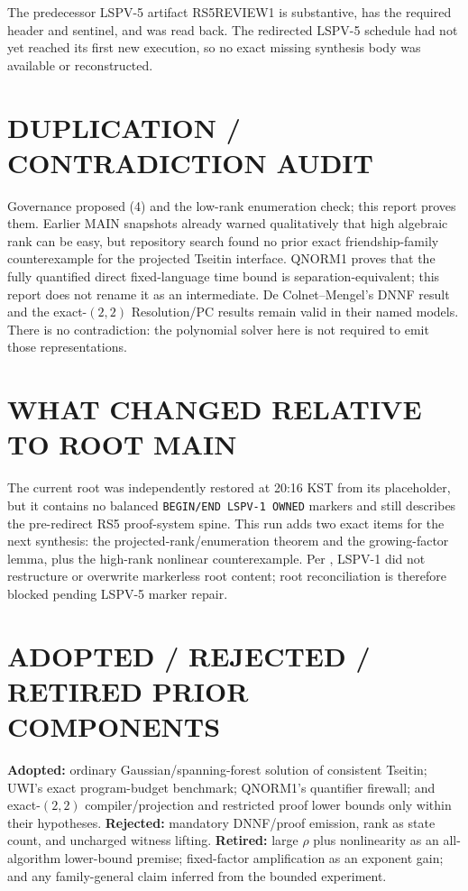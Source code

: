 \documentclass[11pt]{article}
\begin{document}
The predecessor LSPV-5 artifact RS5REVIEW1 is substantive, has the required
header and sentinel, and was read back.  The redirected LSPV-5 schedule had
not yet reached its first new execution, so no exact missing synthesis body
was available or reconstructed.

\section{DUPLICATION / CONTRADICTION AUDIT}
Governance proposed (4) and the low-rank enumeration check; this report proves
them.  Earlier MAIN snapshots already warned qualitatively that high algebraic
rank can be easy, but repository search found no prior exact friendship-family
counterexample for the projected Tseitin interface.  QNORM1 proves that the
fully quantified direct fixed-language time bound is separation-equivalent;
this report does not rename it as an intermediate.  De Colnet--Mengel's DNNF
result and the exact-$(2,2)$ Resolution/PC results remain valid in their named
models.  There is no contradiction: the polynomial solver here is not required
to emit those representations.

\section{WHAT CHANGED RELATIVE TO ROOT MAIN}
The current root was independently restored at 20:16 KST from its placeholder,
but it contains no balanced \texttt{BEGIN/END LSPV-1 OWNED} markers and still
describes the pre-redirect RS5 proof-system spine.  This run adds two exact
items for the next synthesis: the projected-rank/enumeration theorem and the
growing-factor lemma, plus the high-rank nonlinear counterexample.  Per
, LSPV-1 did not restructure or overwrite markerless root
content; root reconciliation is therefore blocked pending LSPV-5 marker repair.

\section{ADOPTED / REJECTED / RETIRED PRIOR COMPONENTS}
\textbf{Adopted:} ordinary Gaussian/spanning-forest solution of consistent
Tseitin; UWI's exact program-budget benchmark; QNORM1's quantifier firewall;
and exact-$(2,2)$ compiler/projection and restricted proof lower bounds only
within their hypotheses.  \textbf{Rejected:} mandatory DNNF/proof emission,
rank as state count, and uncharged witness lifting.  \textbf{Retired:} large
$\rho$ plus nonlinearity as an all-algorithm lower-bound premise; fixed-factor
amplification as an exponent gain; and any family-general claim inferred from
the bounded experiment.
\end{document}
